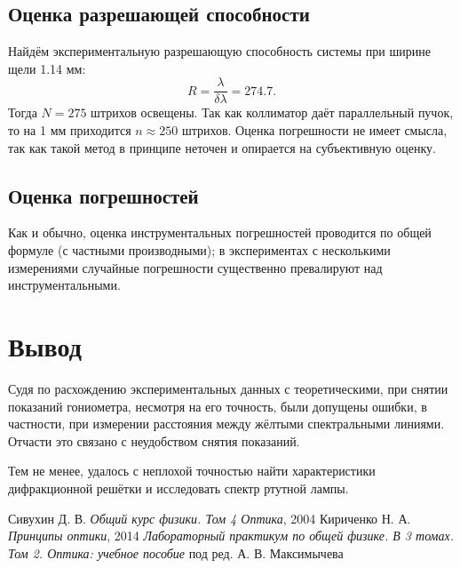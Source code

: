\documentclass[a4paper]{article}
\begin{document}
\subsection{Оценка разрешающей способности}

Найдём экспериментальную разрешающую способность системы при ширине щели 1.14 мм:
\begin{equation*}\label{key}
	R = \frac{\lambda}{\delta \lambda} = 274.7.
\end{equation*}
Тогда $ N =275 $ штрихов освещены. Так как коллиматор даёт параллельный пучок, то на 1 мм приходится $ n\approx 250 $ штрихов. Оценка погрешности не имеет смысла, так как такой метод в принципе неточен и опирается на субъективную оценку.

\subsection{Оценка погрешностей}

Как и обычно, оценка инструментальных погрешностей проводится по общей формуле (с частными производными); в экспериментах с несколькими измерениями случайные погрешности существенно превалируют над инструментальными.

\section{Вывод}

Судя по расхождению экспериментальных данных с теоретическими, при снятии показаний гониометра, несмотря на его точность, были допущены ошибки, в частности, при измерении расстояния между жёлтыми спектральными линиями. Отчасти это связано с неудобством снятия показаний.

Тем не менее, удалось с неплохой точностью найти характеристики дифракционной решётки и исследовать спектр ртутной лампы.

\newpage
\begin{thebibliography}{9}
	 Сивухин Д. В. \emph{Общий курс физики. Том 4 Оптика}, 2004
	 Кириченко Н. А. \emph{Принципы оптики}, 2014
	 \emph{Лабораторный практикум по общей физике. В 3 томах. Том 2. Оптика: учебное пособие} под ред. А. В. Максимычева
\end{thebibliography}
\end{document}
